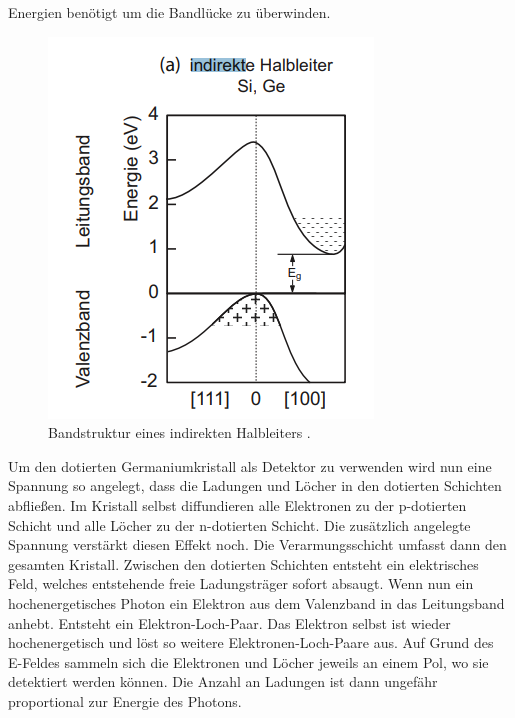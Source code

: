 Energien benötigt um die Bandlücke zu überwinden. 
\begin{figure}[H]
    \centering
    \includegraphics[scale=1.0]{illustration/Indirekter Halbleiter.png}
    \caption{Bandstruktur eines indirekten Halbleiters \cite{Detektor}.}
    \label{fig:Indirekt}
\end{figure}
\noindent Um den dotierten Germaniumkristall als Detektor zu verwenden wird nun eine Spannung so angelegt, dass die Ladungen und Löcher in den dotierten Schichten abfließen.
Im Kristall selbst diffundieren alle Elektronen zu der p-dotierten Schicht und alle Löcher zu der n-dotierten Schicht. Die zusätzlich angelegte 
Spannung verstärkt diesen Effekt noch. Die Verarmungsschicht umfasst dann den gesamten Kristall. Zwischen den dotierten Schichten entsteht ein elektrisches Feld, welches
entstehende freie Ladungsträger sofort absaugt. Wenn nun ein hochenergetisches Photon ein Elektron aus dem Valenzband in das Leitungsband 
anhebt. Entsteht ein Elektron-Loch-Paar. Das Elektron selbst ist wieder hochenergetisch und löst so weitere Elektronen-Loch-Paare aus.
Auf Grund des E-Feldes sammeln sich die Elektronen und Löcher jeweils an einem Pol, wo sie detektiert werden können. Die Anzahl an Ladungen ist dann ungefähr proportional zur Energie des Photons.
